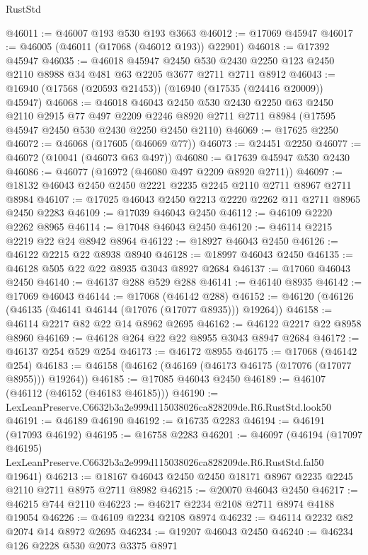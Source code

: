 \begin{lexlean}{RustStd}
\begin{coremodule}
@46011 := @46007 @193 @530 @193 @3663
@46012 := @17069 @45947
@46017 := @46005 (@46011 (@17068 (@46012 @193)) @22901)
@46018 := @17392 @45947
@46035 := @46018
    @45947
    @2450
    @530
    @2430
    @2250
    @123
    @2450
    @2110
    @8988
    @34
    @481
    @63
    @2205
    @3677
    @2711
    @2711
    @8912
@46043 := @16940 (@17568 (@20593 @21453)) (@16940 (@17535 (@24416 @20009)) @45947)
@46068 := @46018
    @46043
    @2450
    @530
    @2430
    @2250
    @63
    @2450
    @2110
    @2915
    @77
    @497
    @2209
    @2246
    @8920
    @2711
    @2711
    @8984
    (@17595 @45947 @2450 @530 @2430 @2250 @2450 @2110)
@46069 := @17625 @2250
@46072 := @46068 (@17605 (@46069 @77))
@46073 := @24451 @2250
@46077 := @46072 (@10041 (@46073 @63 @497))
@46080 := @17639 @45947 @530 @2430
@46086 := @46077 (@16972 (@46080 @497 @2209 @8920 @2711))
@46097 := @18132 @46043 @2450 @2450 @2221 @2235 @2245 @2110 @2711 @8967 @2711 @8984
@46107 := @17025 @46043 @2450 @2213 @2220 @2262 @11 @2711 @8965 @2450 @2283
@46109 := @17039 @46043 @2450
@46112 := @46109 @2220 @2262 @8965
@46114 := @17048 @46043 @2450
@46120 := @46114 @2215 @2219 @22 @24 @8942 @8964
@46122 := @18927 @46043 @2450
@46126 := @46122 @2215 @22 @8938 @8940
@46128 := @18997 @46043 @2450
@46135 := @46128 @505 @22 @22 @8935 @3043 @8927 @2684
@46137 := @17060 @46043 @2450
@46140 := @46137 @288 @529 @288
@46141 := @46140 @8935
@46142 := @17069 @46043
@46144 := @17068 (@46142 @288)
@46152 := @46120 (@46126 (@46135 (@46141 @46144 (@17076 (@17077 @8935))) @19264))
@46158 := @46114 @2217 @82 @22 @14 @8962 @2695
@46162 := @46122 @2217 @22 @8958 @8960
@46169 := @46128 @264 @22 @22 @8955 @3043 @8947 @2684
@46172 := @46137 @254 @529 @254
@46173 := @46172 @8955
@46175 := @17068 (@46142 @254)
@46183 := @46158 (@46162 (@46169 (@46173 @46175 (@17076 (@17077 @8955))) @19264))
@46185 := @17085 @46043 @2450
@46189 := @46107 (@46112 (@46152 (@46183 @46185)))
@46190 := LexLeanPreserve.C6632b3a2e999d115038026ca828209de.R6.RustStd.look50
@46191 := @46189 @46190
@46192 := @16735 @2283
@46194 := @46191 (@17093 @46192)
@46195 := @16758 @2283
@46201 := @46097
    (@46194
      (@17097 @46195)
      LexLeanPreserve.C6632b3a2e999d115038026ca828209de.R6.RustStd.fal50
      @19641)
@46213 := @18167 @46043 @2450 @2450 @18171 @8967 @2235 @2245 @2110 @2711 @8975 @2711 @8982
@46215 := @20070 @46043 @2450
@46217 := @46215 @744 @2110
@46223 := @46217 @2234 @2108 @2711 @8974 @4188 @19054
@46226 := @46109 @2234 @2108 @8974
@46232 := @46114 @2232 @82 @2074 @14 @8972 @2695
@46234 := @19207 @46043 @2450
@46240 := @46234 @126 @2228 @530 @2073 @3375 @8971

\end{coremodule}
\end{lexlean}

